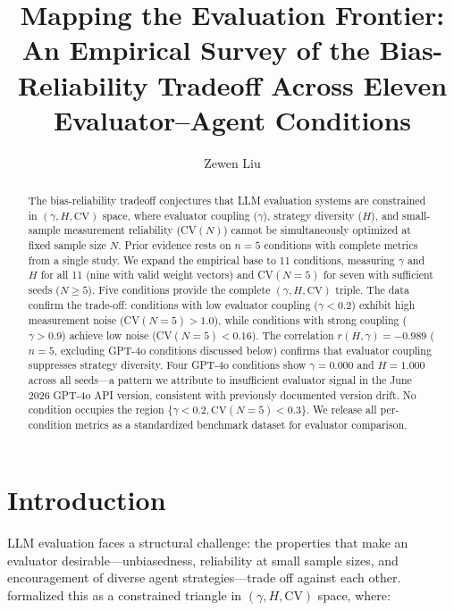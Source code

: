 \documentclass[11pt]{article}
\title{Mapping the Evaluation Frontier: An Empirical Survey of the Bias-Reliability Tradeoff Across Eleven Evaluator--Agent Conditions}
\author{Zewen Liu}
\date{}
\begin{document}
\maketitle

\begin{abstract}
The bias-reliability tradeoff conjectures that LLM evaluation systems are constrained in $(\gamma, H, \text{CV})$ space, where evaluator coupling ($\gamma$), strategy diversity ($H$), and small-sample measurement reliability (CV$(N)$) cannot be simultaneously optimized at fixed sample size $N$. Prior evidence rests on $n{=}5$ conditions with complete metrics from a single study. We expand the empirical base to 11 conditions, measuring $\gamma$ and $H$ for all 11 (nine with valid weight vectors) and CV$(N{=}5)$ for seven with sufficient seeds ($N \geq 5$). Five conditions provide the complete $(\gamma, H, \text{CV})$ triple. The data confirm the trade-off: conditions with low evaluator coupling ($\gamma < 0.2$) exhibit high measurement noise (CV$(N{=}5) > 1.0$), while conditions with strong coupling ($\gamma > 0.9$) achieve low noise (CV$(N{=}5) < 0.16$). The correlation $r(H, \gamma) = -0.989$ ($n{=}5$, excluding GPT-4o conditions discussed below) confirms that evaluator coupling suppresses strategy diversity. Four GPT-4o conditions show $\gamma{=}0.000$ and $H{=}1.000$ across all seeds---a pattern we attribute to insufficient evaluator signal in the June 2026 GPT-4o API version, consistent with previously documented version drift. No condition occupies the region $\{\gamma < 0.2, \text{CV}(N{=}5) < 0.3\}$. We release all per-condition metrics as a standardized benchmark dataset for evaluator comparison.
\end{abstract}

\section{Introduction}

LLM evaluation faces a structural challenge: the properties that make an evaluator desirable---unbiasedness, reliability at small sample sizes, and encouragement of diverse agent strategies---trade off against each other. \citet{liu2026triangle} formalized this as a constrained triangle in $(\gamma, H, \text{CV})$ space, where:
\end{document}
